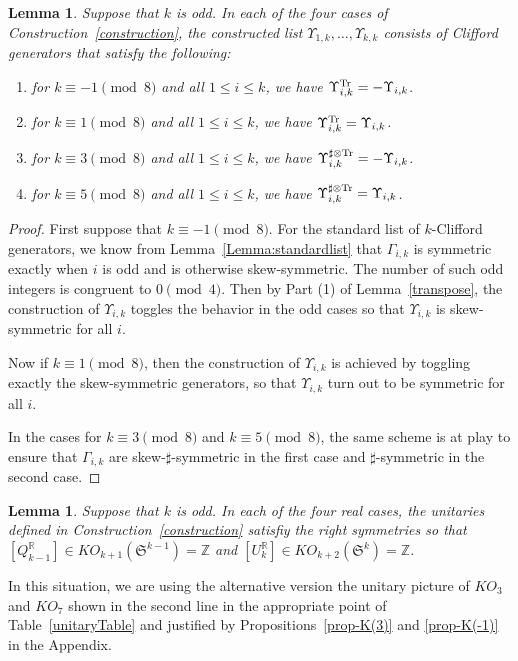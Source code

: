 \documentclass[12pt, reqno]{amsart}
\newtheorem{lemma}[thm]{Lemma}
\theoremstyle{definition}
\def\R{{\mathbb R}}
\def\T{{\mathbb T}}
\def\Z{{\mathbb Z}}
\def\Up{{\Upsilon}}
\def\pr{^{\scriptscriptstyle \R}}
\def\T{ ^{\rm{Tr}}}
\def\sT{ ^{\sharp \otimes {\rm{Tr}}}}
\newcommand{\fS}{\mathfrak S}
\begin{document}
\begin{lemma} \label{lemma:sigma-generators}
Suppose that $k$ is odd. In each of the four cases of Construction~\ref{construction}, the constructed list $\Up_{1,k}, \dots, \Up_{k,k}$ consists of Clifford generators that satisfy the following:
\begin{enumerate}
\item for $k \equiv -1 \pmod 8$ and all $1 \leq i \leq k$, we have $\Up_{i,k}\T = -\Up_{i,k}$.
\item for $k \equiv 1 \pmod 8$ and all $1 \leq i \leq k$, we have $\Up_{i,k}\T = \Up_{i,k}$.
\item for $k \equiv 3 \pmod 8$ and all $1 \leq i \leq k$, we have $\Up_{i,k}\sT = -\Up_{i,k}$.
\item for $k \equiv 5 \pmod 8$ and all $1 \leq i \leq k$, we have $\Up_{i,k}\sT = \Up_{i,k}$.
\end{enumerate}
\end{lemma}

\begin{proof}
First suppose that $k \equiv -1 \pmod 8$. For the standard list of $k$-Clifford generators, we know from Lemma~\ref{Lemma:standardlist} that 
$\Gamma_{i,k}$ is symmetric exactly when $i$ is odd and is otherwise skew-symmetric.
The number of such odd integers is congruent to $0 \pmod 4$. Then by Part (1) of Lemma~\ref{transpose}, the construction of $\Up_{i,k}$ toggles the behavior in the odd cases
so that $\Up_{i,k}$ is skew-symmetric for all $i$.

Now if $k \equiv 1 \pmod 8$, then the construction of $\Up_{i,k}$ is achieved by toggling exactly the skew-symmetric generators, so that $\Up_{i,k}$ turn out to be symmetric for all $i$.

In the cases for $k \equiv 3 \pmod 8$ and $k \equiv 5 \pmod 8$, the same scheme is at play to ensure that $\Gamma_{i,k}$ are skew-$\sharp$-symmetric in the first case and $\sharp$-symmetric in the second case.
\end{proof}

\begin{lemma} \label{lemma:KO}
Suppose that $k$ is odd. 
In each of the four real cases, the unitaries defined in Construction~\ref{construction} satisfiy the right symmetries so that  $[Q\pr_{k-1}] \in KO_{k+1}(\fS^{k-1}) = \Z$ and $[U\pr_k] \in KO_{k+2}(\fS^k) = \Z$. 
\end{lemma}

In this situation, we are using the alternative version the unitary picture of $KO_3$ and $KO_7$ shown in the second line in the appropriate point of Table~\ref{unitaryTable} and justified by Propositions~\ref{prop-K(3)} and \ref{prop-K(-1)} in the Appendix.
\end{document}
